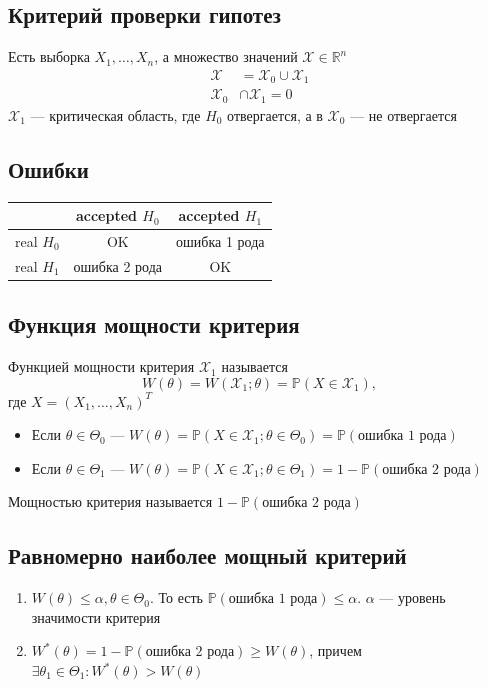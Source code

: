 \documentclass[a4paper, 10pt]{article}
\begin{document}
\subsection{Критерий проверки гипотез}
Есть выборка $X_1,\ldots,X_n$, а множество значений $\mathcal{X}\in\mathbb{R}^n$
\begin{equation*}
    \begin{aligned}
        \mathcal{X}&=\mathcal{X}_0\cup\mathcal{X}_1\\
        \mathcal{X}_0&\cap\mathcal{X}_1=0
    \end{aligned}
\end{equation*}
$\mathcal{X}_1$ — критическая область, где $H_0$ отвергается, а в $\mathcal{X}_0$ — не отвергается

\subsection{Ошибки}
\begin{tabular}{c|c|c}
    &accepted $H_0$&accepted $H_1$\\
    \hline
    real $H_0$&OK&ошибка 1 рода\\
    \hline
    real $H_1$&ошибка 2 рода&OK
\end{tabular}

\subsection{Функция мощности критерия}
 Функцией мощности критерия $\mathcal{X}_1$ называется
\begin{equation*}
    W(\theta)=W(\mathcal{X}_1;\theta)=\mathbb{P}\left(X\in\mathcal{X}_1\right),
\end{equation*}
где $X=(X_1,\ldots,X_n)^T$

\begin{itemize}
    \item Если $\theta\in\Theta_0$ — $W(\theta)=\mathbb{P}\left(X\in\mathcal{X}_1;\theta\in\Theta_0\right)=\mathbb{P}(\text{ошибка 1 рода})$
    \item Если $\theta\in\Theta_1$ — $W(\theta)=\mathbb{P}\left(X\in\mathcal{X}_1;\theta\in\Theta_1\right)=1-\mathbb{P}(\text{ошибка 2 рода})$
\end{itemize}

 Мощностью критерия называется $1-\mathbb{P}(\text{ошибка 2 рода})$

\subsection{Равномерно наиболее мощный критерий}
\begin{enumerate}
    \item $W(\theta)\leqslant\alpha,\theta\in\Theta_0$. То есть $\mathbb{P}(\text{ошибка 1 рода})\leqslant\alpha$. $\alpha$ — уровень значимости критерия
    \item $W^{*}(\theta)=1-\mathbb{P}(\text{ошибка 2 рода})\geqslant W(\theta)$, причем $\exists\theta_1\in\Theta_1: W^{*}(\theta)>W(\theta)$
\end{enumerate}
\end{document}
